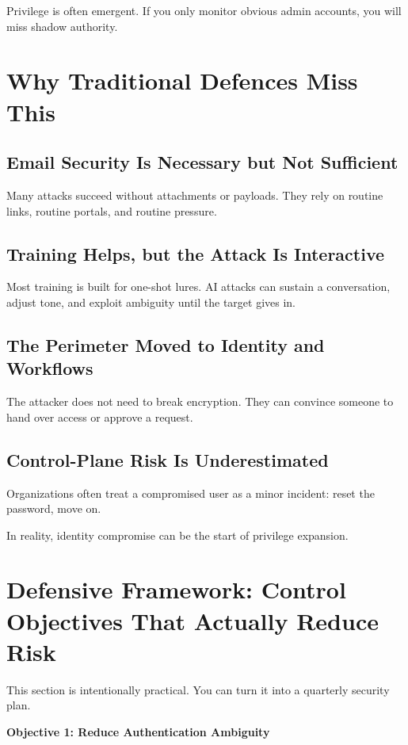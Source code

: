 \documentclass[11pt]{article}
\begin{document}
Privilege is often emergent. If you only monitor obvious admin accounts, you will miss shadow authority.

\section{Why Traditional Defences Miss This}

\subsection{Email Security Is Necessary but Not Sufficient}

Many attacks succeed without attachments or payloads. They rely on routine links, routine portals, and routine pressure.

\subsection{Training Helps, but the Attack Is Interactive}

Most training is built for one-shot lures. AI attacks can sustain a conversation, adjust tone, and exploit ambiguity until the target gives in.

\subsection{The Perimeter Moved to Identity and Workflows}

The attacker does not need to break encryption. They can convince someone to hand over access or approve a request.

\subsection{Control-Plane Risk Is Underestimated}

Organizations often treat a compromised user as a minor incident: reset the password, move on.

In reality, identity compromise can be the start of privilege expansion.

\section{Defensive Framework: Control Objectives That Actually Reduce Risk}

This section is intentionally practical. You can turn it into a quarterly security plan.

\textbf{Objective 1: Reduce Authentication Ambiguity}
\end{document}
